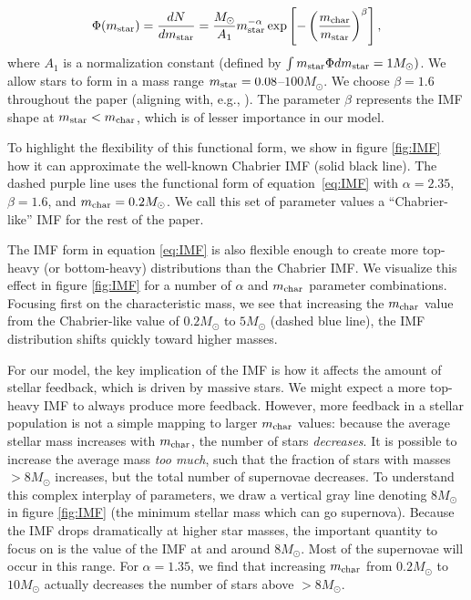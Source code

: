 \documentclass[a4paper,11pt]{article}
\begin{document}
\begin{equation}
    \Phi (m_{\rm star}) = \frac{dN}{dm_{\rm star}} = \frac{M_{\odot}}{A_{1}} m_{\rm star}^{-\alpha} \exp \left[ - \left( \frac{m_{\rm char}}{m_{\rm star}}  \right)^{\beta} \right], \label{eq:IMF}
\end{equation}
%
where $A_{1}$ is a normalization constant (defined by $\int m_{\rm star} \Phi dm_{\rm star} = 1 M_{\odot})$. We allow stars to form in a mass range $m_{\rm star} = 0.08$--$100 M_{\odot}$. We choose $\beta = 1.6$ throughout the paper (aligning with, e.g., \cite{Wise2012, Jeon2015, Lazar2022}). The parameter $\beta$ represents the IMF shape at $m_{\rm star} < m_{\rm char}$, which is of lesser importance in our model.

To highlight the flexibility of this functional form, we show in figure \ref{fig:IMF} how it can approximate the well-known Chabrier IMF \cite{Chabrier2003} (solid black line). The dashed purple line uses the functional form of equation~\ref{eq:IMF} with $\alpha =2.35$, $\beta=1.6$, and $m_{\rm char}=0.2 M_{\odot}$. We call this set of parameter values a ``Chabrier-like'' IMF for the rest of the paper. 

The IMF form in equation \ref{eq:IMF} is also flexible enough to create more top-heavy (or bottom-heavy) distributions than the Chabrier IMF. We visualize this effect in figure \ref{fig:IMF} for a number of $\alpha$ and $m_{\rm char}$ parameter combinations. Focusing first on the characteristic mass, we see that increasing the $m_{\rm char}$ value from the Chabrier-like value of $0.2 M_{\odot}$ to $5 M_{\odot}$ (dashed blue line), the IMF distribution shifts quickly toward higher masses.

For our model, the key implication of the IMF is how it affects the amount of stellar feedback, which is driven by massive stars. We might expect a more top-heavy IMF to always produce more feedback. However, more feedback in a stellar population is not a simple mapping to larger $m_{\rm char}$ values: because the average stellar mass increases with $m_{\rm char}$, the number of stars \textit{decreases}. It is possible to increase the average mass \textit{too much}, such that the fraction of stars with masses $> 8 M_{\odot}$ increases, but the total number of supernovae decreases. To understand this complex interplay of parameters, we draw a vertical gray line denoting $8 M_{\odot}$ in figure \ref{fig:IMF} (the minimum stellar mass which can go supernova). Because the IMF drops dramatically at higher star masses, the important quantity to focus on is the value of the IMF at and around $8 M_{\odot}$. Most of the supernovae will occur in this range. For $\alpha = 1.35$, we find that increasing $m_{\rm char}$ from $0.2 M_{\odot}$ to $10 M_{\odot}$ actually decreases the number of stars above $> 8 M_{\odot}$.
\end{document}
